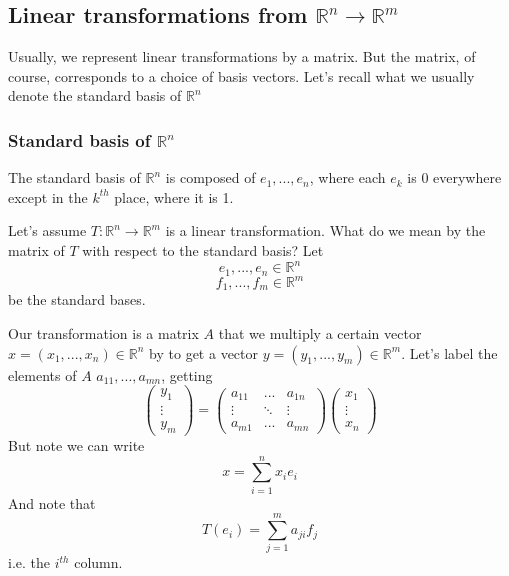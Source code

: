 \documentclass{article}
\newcommand{\reals}[0]{\mathbb{R}}
\begin{document}
\subsection{Linear transformations from \(\reals^n \to \reals^m\)}

Usually, we represent linear transformations by a matrix. But the matrix, of course, corresponds to a choice of basis vectors. Let's recall what we usually denote the standard basis of \(\reals^n\)

\subsubsection{Standard basis of \(\reals^n\)}

The standard basis of \(\reals^n\) is composed of \(e_1,...,e_n\), where each \(e_k\) is 0 everywhere except in the \(k^{th}\) place, where it is 1.

Let's assume \(T: \reals^n \to \reals^m\) is a linear transformation. What do we mean by the matrix of \(T\) with respect to the standard basis? Let
\begin{equation}e_1,...,e_n \in \reals^n\end{equation}
\begin{equation}f_1,...,f_m \in \reals^m\end{equation}
be the standard bases.

Our transformation is a matrix \(A\) that we multiply a certain vector \(x = (x_1,...,x_n) \in \reals^n\) by to get a vector \(y = (y_1,...,y_m) \in \reals^m\). Let's label the elements of \(A\) \(a_{11},...,a_{mn}\), getting
\begin{equation}\begin{pmatrix} y_1 \\ \vdots \\ y_m \end{pmatrix} =
\begin{pmatrix}
  a_{11} & ... & a_{1n} \\
  \vdots & \ddots & \vdots \\
  a_{m1} & ... & a_{mn}
\end{pmatrix}\begin{pmatrix}
  x_1 \\ \vdots \\ x_n
\end{pmatrix}\end{equation}
But note we can write
\begin{equation}x = \sum_{i = 1}^nx_ie_i\end{equation}
And note that
\begin{equation}T(e_i) = \sum_{j = 1}^ma_{ji}f_j\end{equation}
i.e. the \(i^{th}\) column.
\end{document}
